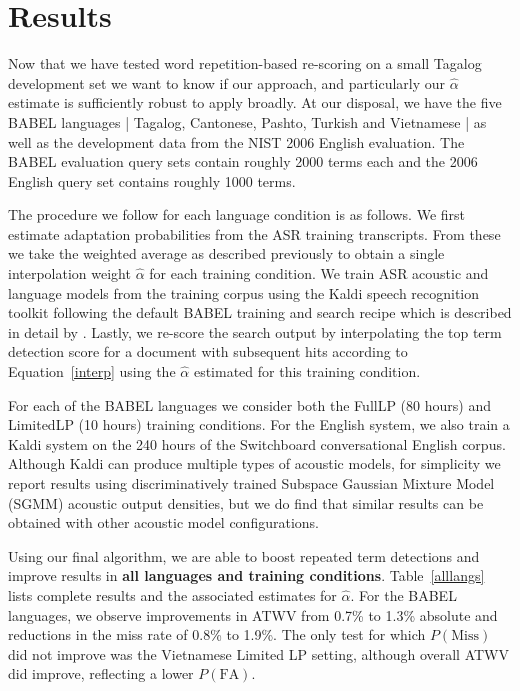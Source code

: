 \documentclass[11pt]{article}
\begin{document}
\section{Results}
Now that we have tested word repetition-based re-scoring on a small Tagalog development set we want to know if our approach, and particularly our $\widehat{\alpha}$ estimate is sufficiently robust to apply broadly.  At our disposal, we have the five {\small BABEL} languages | Tagalog, Cantonese, Pashto, Turkish and Vietnamese | as well as the development data from the NIST 2006 English evaluation.  The {\small BABEL} evaluation query sets contain roughly 2000 terms each and the 2006 English query set contains roughly 1000 terms.

The procedure we follow for each language condition is as follows.  We  first estimate adaptation probabilities from the ASR training transcripts.   From these we take the weighted average as described previously to obtain a single interpolation weight $\widehat{\alpha}$ for each training condition.   We train ASR acoustic and language models from the training corpus using the Kaldi speech recognition toolkit \cite{kaldi} following the default {\small BABEL} training and search recipe which is described in detail by .  Lastly, we re-score the search output by interpolating the top term detection score for a document with subsequent hits according to Equation~\ref{interp} using the $\widehat{\alpha}$ estimated for this training condition.

For each of the {\small BABEL} languages we consider both the FullLP (80 hours) and LimitedLP (10 hours) training conditions.   For the English system, we also train a Kaldi system on the 240 hours of the Switchboard conversational English corpus.  Although Kaldi can produce multiple types of acoustic models, for simplicity we report  results using discriminatively trained Subspace Gaussian Mixture Model (SGMM) acoustic output densities, but we do find that similar results can be obtained with other acoustic model configurations.  

Using our final algorithm, we are able to boost repeated term detections and improve results in \textbf{all languages and training conditions}.   Table~\ref{alllangs} lists complete results and the associated estimates for $\widehat{\alpha}$.  For the {\small BABEL} languages, we observe improvements in ATWV from 0.7\% to 1.3\% absolute and reductions in the miss rate of 0.8\% to 1.9\%.  The only test for which $P(\mathrm{Miss})$ did not improve was the Vietnamese Limited LP setting, although overall ATWV did improve, reflecting a lower $P(\mathrm{FA})$.   
\end{document}
